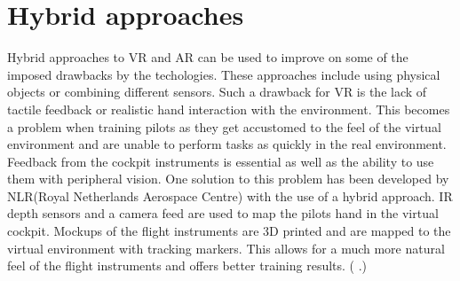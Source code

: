 \documentclass[12pt, a4paper,oneside, nocenter]{thesis}
\renewcommand{\citep}[1]{(\citeauthor{#1} \citeyear{#1}.)}
\begin{document}
\section{Hybrid approaches}
\par
Hybrid approaches to VR and AR can be used to improve on some of the imposed drawbacks by the techologies. These approaches include using physical objects or combining different sensors.
Such a drawback for VR is the lack of tactile feedback or realistic hand interaction with the environment. This becomes a problem when training pilots as they get accustomed to the feel of the virtual environment and are unable to perform tasks as quickly in the real environment.
Feedback from the cockpit instruments is essential as well as the ability to use them with peripheral vision.
One solution to this problem has been developed by NLR(Royal Netherlands Aerospace Centre) with the use of a hybrid approach.
IR depth sensors and a camera feed are used to map the pilots hand in the virtual cockpit. Mockups of the flight instruments are 3D printed and are mapped to the virtual environment with tracking markers.
This allows for a much more natural feel of the flight instruments and offers better training results. \citep{nlr-vr}
\\
\end{document}
